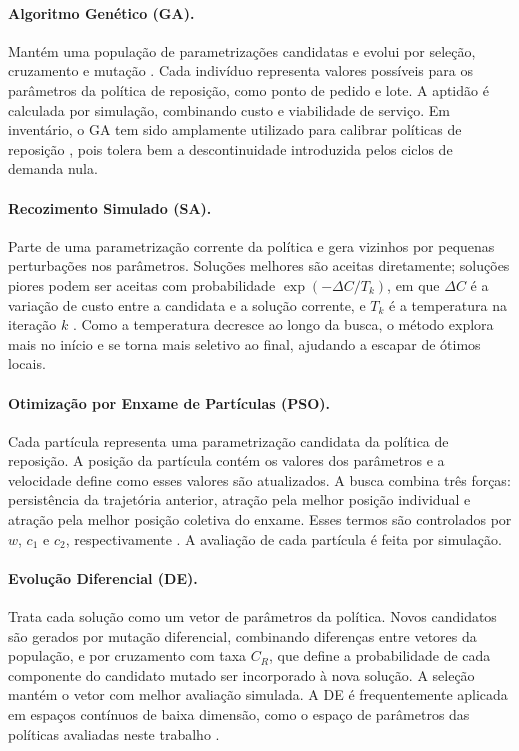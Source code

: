 \paragraph{Algoritmo Genético (GA).}
Mantém uma população de parametrizações candidatas e evolui por seleção, cruzamento e mutação \citep{Holland1992ANAS,Talbi2009Metaheuristics}. Cada indivíduo representa valores possíveis para os parâmetros da política de reposição, como ponto de pedido e lote. A aptidão é calculada por simulação, combinando custo e viabilidade de serviço. Em inventário, o GA tem sido amplamente utilizado para calibrar políticas de reposição \citep{Yuna2023IntermittentMetaheuristics}, pois tolera bem a descontinuidade introduzida pelos ciclos de demanda nula.

\paragraph{Recozimento Simulado (SA).}
Parte de uma parametrização corrente da política e gera vizinhos por pequenas perturbações nos parâmetros. Soluções melhores são aceitas diretamente; soluções piores podem ser aceitas com probabilidade $\exp(-\Delta C / T_k)$, em que $\Delta C$ é a variação de custo entre a candidata e a solução corrente, e $T_k$ é a temperatura na iteração $k$ \citep{Kirkpatrick1983SA}. Como a temperatura decresce ao longo da busca, o método explora mais no início e se torna mais seletivo ao final, ajudando a escapar de ótimos locais.

\paragraph{Otimização por Enxame de Partículas (PSO).}
Cada partícula representa uma parametrização candidata da política de reposição. A posição da partícula contém os valores dos parâmetros e a velocidade define como esses valores são atualizados. A busca combina três forças: persistência da trajetória anterior, atração pela melhor posição individual e atração pela melhor posição coletiva do enxame. Esses termos são controlados por $w$, $c_1$ e $c_2$, respectivamente \citep{Kennedy1995PSO}. A avaliação de cada partícula é feita por simulação.

\paragraph{Evolução Diferencial (DE).}
Trata cada solução como um vetor de parâmetros da política. Novos candidatos são gerados por mutação diferencial, combinando diferenças entre vetores da população, e por cruzamento com taxa $C_R$, que define a probabilidade de cada componente do candidato mutado ser incorporado à nova solução. A seleção mantém o vetor com melhor avaliação simulada. A DE é frequentemente aplicada em espaços contínuos de baixa dimensão, como o espaço de parâmetros das políticas avaliadas neste trabalho \citep{Storn1997DE}.

